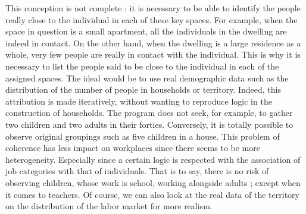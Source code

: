 This conception is not complete : it is necessary to be able to identify the people really close to the individual in each of these key spaces. For example, when the space in question is a small apartment, all the individuals in the dwelling are indeed in contact. On the other hand, when the dwelling is a large residence as a whole, very few people are really in contact with the individual. This is why it is necessary to list the people said to be close to the individual in each of the assigned spaces. The ideal would be to use real demographic data such as the distribution of the number of people in households or territory. Indeed, this attribution is made iteratively, without wanting to reproduce logic in the construction of households. The program does not seek, for example, to gather two children and two adults in their forties. Conversely, it is totally possible to observe original groupings such as five children in a house. This problem of coherence has less impact on workplaces since there seems to be more heterogeneity. Especially since a certain logic is respected with the association of job categories with that of individuals. That is to say, there is no risk of observing children, whose work is school, working alongside adults ; except when it comes to teachers. Of course, we can also look at the real data of the territory on the distribution of the labor market for more realism.

